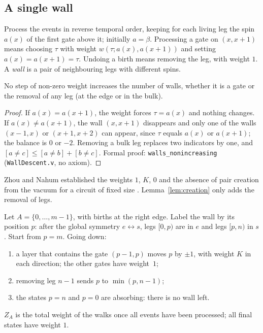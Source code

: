 \subsection{A single wall}

Process the events in reverse temporal order, keeping for each living leg the spin $a(x)$ of the first gate above it; initially $a=\beta$. Processing a gate on $(x,x+1)$ means choosing $\tau$ with weight $w(\tau;a(x),a(x+1))$ and setting $a(x)=a(x+1)=\tau$. Undoing a birth means removing the leg, with weight $1$. A \emph{wall} is a pair of neighbouring legs with different spins.

\begin{lemma}[no creation]\label{lem:creation}
No step of non-zero weight increases the number of walls, whether it is a gate or the removal of any leg (at the edge or in the bulk).
\end{lemma}
\begin{proof}
If $a(x)=a(x+1)$, the weight forces $\tau=a(x)$ and nothing changes. If $a(x)\ne a(x+1)$, the wall $(x,x+1)$ disappears and only one of the walls $(x-1,x)$ or $(x+1,x+2)$ can appear, since $\tau$ equals $a(x)$ or $a(x+1)$; the balance is $0$ or $-2$. Removing a bulk leg replaces two indicators by one, and $[a\ne c]\le[a\ne b]+[b\ne c]$. Formal proof: \texttt{walls\_nonincreasing} (\texttt{WallDescent.v}, no axiom).
\end{proof}

Zhou and Nahum established the weights $1$, $K$, $0$ and the absence of pair creation from the vacuum for a circuit of fixed size \cite{ZhouNahum2019}. Lemma~\ref{lem:creation} only adds the removal of legs.

\begin{proposition}\label{prop:single}
Let $A=\{0,\dots,m-1\}$, with births at the right edge. Label the wall by its position $p$: after the global symmetry $e\leftrightarrow s$, legs $[0,p)$ are in $e$ and legs $[p,n)$ in $s$. Start from $p=m$. Going down:
\begin{enumerate}[nosep]
\item a layer that contains the gate $(p-1,p)$ moves $p$ by $\pm1$, with weight $K$ in each direction; the other gates have weight~$1$;
\item removing leg $n-1$ sends $p$ to $\min(p,n-1)$;
\item the states $p=n$ and $p=0$ are absorbing: there is no wall left.
\end{enumerate}
$Z_A$ is the total weight of the walks once all events have been processed; all final states have weight $1$.
\end{proposition}

